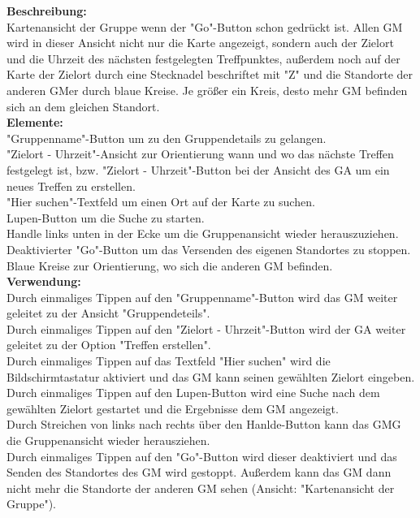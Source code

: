 \textbf{Beschreibung:}\\
Kartenansicht der Gruppe wenn der "Go"-Button schon gedrückt ist. Allen GM wird in dieser Ansicht nicht nur die Karte angezeigt, sondern auch der Zielort und die Uhrzeit des nächsten festgelegten Treffpunktes, außerdem noch auf der Karte der Zielort durch eine Stecknadel beschriftet mit "Z" und die Standorte der anderen GMer durch blaue Kreise. Je größer ein Kreis, desto mehr GM befinden sich an dem gleichen Standort.\\
\textbf{Elemente:}\\
"Gruppenname"-Button um zu den Gruppendetails zu gelangen.\\
"Zielort - Uhrzeit"-Ansicht zur Orientierung wann und wo das nächste Treffen festgelegt ist, bzw. "Zielort - Uhrzeit"-Button bei der Ansicht des GA um ein neues Treffen zu erstellen.\\
"Hier suchen"-Textfeld um einen Ort auf der Karte zu suchen.\\
Lupen-Button um die Suche zu starten.\\
Handle links unten in der Ecke um die Gruppenansicht wieder herauszuziehen.\\
Deaktivierter "Go"-Button um das Versenden des eigenen Standortes zu stoppen.\\
Blaue Kreise zur Orientierung, wo sich die anderen GM befinden.\\
\textbf{Verwendung:}\\
Durch einmaliges Tippen auf den "Gruppenname"-Button wird das GM weiter geleitet zu der Ansicht "Gruppendeteils".\\
Durch einmaliges Tippen auf den "Zielort - Uhrzeit"-Button wird der GA weiter geleitet zu der Option "Treffen erstellen".\\
Durch einmaliges Tippen auf das Textfeld "Hier suchen" wird die Bildschirmtastatur aktiviert und das GM kann seinen gewählten Zielort eingeben.\\
Durch einmaliges Tippen auf den Lupen-Button wird eine Suche nach dem gewählten Zielort gestartet und die Ergebnisse dem GM angezeigt.\\
Durch Streichen von links nach rechts über den Hanlde-Button kann das GMG die Gruppenansicht wieder herausziehen.\\
Durch einmaliges Tippen auf den "Go"-Button wird dieser deaktiviert und das Senden des Standortes des GM wird gestoppt. Außerdem kann das GM dann nicht mehr die Standorte der anderen GM sehen (Ansicht: "Kartenansicht der Gruppe").
\newpage


